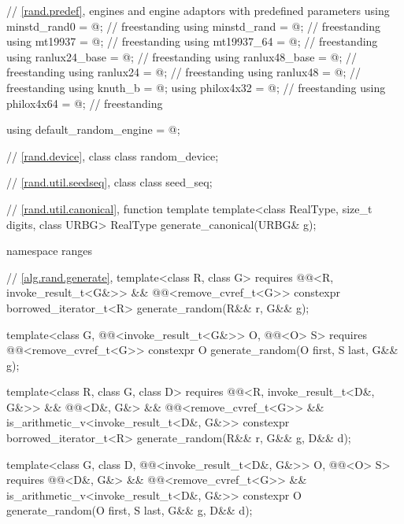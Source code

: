 \begin{codeblock}
{  // \ref{rand.predef}, engines and engine adaptors with predefined parameters
  using minstd_rand0  = @\seebelow@;      // freestanding
  using minstd_rand   = @\seebelow@;      // freestanding
  using mt19937       = @\seebelow@;      // freestanding
  using mt19937_64    = @\seebelow@;      // freestanding
  using ranlux24_base = @\seebelow@;      // freestanding
  using ranlux48_base = @\seebelow@;      // freestanding
  using ranlux24      = @\seebelow@;      // freestanding
  using ranlux48      = @\seebelow@;      // freestanding
  using knuth_b       = @\seebelow@;
  using philox4x32    = @\seebelow@;      // freestanding
  using philox4x64    = @\seebelow@;      // freestanding

  using default_random_engine = @\seebelow@;

  // \ref{rand.device}, class 
  class random_device;

  // \ref{rand.util.seedseq}, class 
  class seed_seq;

  // \ref{rand.util.canonical}, function template 
  template<class RealType, size_t digits, class URBG>
    RealType generate_canonical(URBG& g);

  namespace ranges {
    // \ref{alg.rand.generate}, 
    template<class R, class G>
      requires @@<R, invoke_result_t<G&>> &&
               @@<remove_cvref_t<G>>
      constexpr borrowed_iterator_t<R> generate_random(R&& r, G&& g);

    template<class G, @@<invoke_result_t<G&>> O, @@<O> S>
      requires @@<remove_cvref_t<G>>
      constexpr O generate_random(O first, S last, G&& g);

    template<class R, class G, class D>
      requires @@<R, invoke_result_t<D&, G&>> && @@<D&, G&> &&
               @@<remove_cvref_t<G>> &&
               is_arithmetic_v<invoke_result_t<D&, G&>>
    constexpr borrowed_iterator_t<R> generate_random(R&& r, G&& g, D&& d);

    template<class G, class D, @@<invoke_result_t<D&, G&>> O, @@<O> S>
      requires @@<D&, G&> && @@<remove_cvref_t<G>> &&
               is_arithmetic_v<invoke_result_t<D&, G&>>
    constexpr O generate_random(O first, S last, G&& g, D&& d);
  }

}
\end{codeblock}

